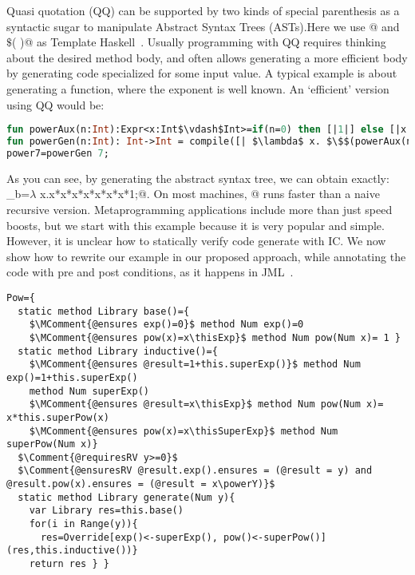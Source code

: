 \documentclass[a4paper,twoside,british,9pt]{extarticle}
\begin{document}
Quasi quotation (QQ) can be supported by two kinds of special parenthesis as a syntactic sugar to manipulate Abstract Syntax Trees (ASTs).Here we use
\Q@[|  |]@  and \Q@$\$$(  )@ as Template Haskell~\cite{sheard2002template}.
Usually programming with QQ requires thinking about the desired method body,
 and often allows generating a more efficient body by generating code specialized for some input value.
A typical example is about generating a \Q@pow@ function, where the exponent is well known.
An `efficient' version using QQ would be:
\vspace{-1ex}
\begin{lstlisting}[language=ML]
fun powerAux(n:Int):Expr<x:Int$\vdash$Int>=if(n=0) then [|1|] else [|x * $\$$(powerAux(n-1)) |];
fun powerGen(n:Int): Int->Int = compile([| $\lambda$ x. $\$$(powerAux(n)) |]);
power7=powerGen 7;
\end{lstlisting}
\vspace{-2ex}
\noindent As you can see, by generating the abstract syntax tree, we can obtain exactly:
_b=$\lambda$ x.x*x*x*x*x*x*x*1;@. On most machines, @ runs faster than a naive recursive version.
Metaprogramming applications include more than just speed boosts, but we start with this example because it is very popular and simple.
However, it is unclear how to statically verify
code generate with IC.
We now show how to rewrite our \Q@pow@ example
in our proposed approach, while annotating the code with pre and post conditions, as it happens in JML~\cite{jml}.
\newcommand\thisExp{\ensuremath{{}^{\textbf{this.exp()}}}}
\newcommand\thisSuperExp{\ensuremath{{}^{\textbf{this.superExp()}}}}
\newcommand\oneThisSuperExp{\ensuremath{{}^{\textbf{1+this.superExp()}}}}
\newcommand\powerY{\ensuremath{{}^{\textbf{y}}}}
\vspace{-1ex}
\begin{lstlisting}[language=FortyTwo]
Pow={
  static method Library base()={
    $\MComment{@ensures exp()=0}$ method Num exp()=0 
    $\MComment{@ensures pow(x)=x\thisExp}$ method Num pow(Num x)= 1 }
  static method Library inductive()={
    $\MComment{@ensures @result=1+this.superExp()}$ method Num exp()=1+this.superExp() 
    method Num superExp()
    $\MComment{@ensures @result=x\thisExp}$ method Num pow(Num x)= x*this.superPow(x)
    $\MComment{@ensures pow(x)=x\thisSuperExp}$ method Num superPow(Num x)}
  $\Comment{@requiresRV y>=0}$
  $\Comment{@ensuresRV @result.exp().ensures = (@result = y) and @result.pow(x).ensures = (@result = x\powerY)}$
  static method Library generate(Num y){
    var Library res=this.base()
    for(i in Range(y)){
      res=Override[exp()<-superExp(), pow()<-superPow()](res,this.inductive())}
    return res } }
\end{lstlisting}
\end{document}
